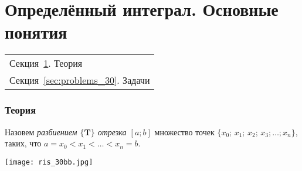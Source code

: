 \documentclass[10pt]{article}
\begin{document}
\setcounter{footnote}{0}

\setcounter{section}{0}

\setcounter{part}{29}
	\flushbottom
	\newpage
	\pagestyle{fancynotes}
	\part[Определённый интеграл. Основные понятия]{Определённый интеграл. \newline Основные понятия}
	\begin{margintable}\vspace{.8in}\footnotesize
		\begin{tabularx}{\marginparwidth}{|X}
		Секция~\ref{sec:theory_30}. Теория\\
		Секция~\ref{sec:problems_30}. Задачи\\
		\end{tabularx}
	\end{margintable}
	\section[Теория]{Теория}\label{sec:theory_30}

{}


\vspace{1ex}

\begin{definition}
Назовем \emph{разбиением $\textbf{\{T\}}$ отрезка $[a; b]$} множество точек $\{x_0; \, x_1; \, x_2; \, x_3; \ldots ;x_n\}$, таких, что $a = x_0 < x_1 < \ldots < x_n = b$.
\end{definition}

\vspace{0ex}
\begin{center}
\texttt{[image: ris\_30bb.jpg]}
\end{center}
\vspace{-3ex}
\end{document}
